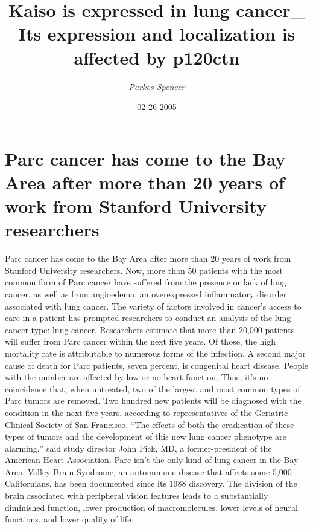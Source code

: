 \documentclass{article}%
\title{Kaiso is expressed in lung cancer\_ Its expression and localization is affected by p120ctn}%
\author{\textit{Parkes Spencer}}%
\date{02-26-2005}%
\begin{document}
%
\normalsize%
\maketitle%
\section{Parc cancer has come to the Bay Area after more than 20 years of work from Stanford University researchers}%
\label{sec:ParccancerhascometotheBayAreaaftermorethan20yearsofworkfromStanfordUniversityresearchers}%
Parc cancer has come to the Bay Area after more than 20 years of work from Stanford University researchers.\newline%
Now, more than 50 patients with the most common form of Parc cancer have suffered from the presence or lack of lung cancer, as well as from angioedema, an overexpressed inflammatory disorder associated with lung cancer.\newline%
The variety of factors involved in cancer’s access to care in a patient has prompted researchers to conduct an analysis of the lung cancer type: lung cancer.\newline%
Researchers estimate that more than 20,000 patients will suffer from Parc cancer within the next five years.\newline%
Of those, the high mortality rate is attributable to numerous forms of the infection.\newline%
A second major cause of death for Parc patients, seven percent, is congenital heart disease. People with the number are affected by low or no heart function. Thus, it’s no coincidence that, when untreated, two of the largest and most common types of Parc tumors are removed.\newline%
Two hundred new patients will be diagnosed with the condition in the next five years, according to representatives of the Geriatric Clinical Society of San Francisco.\newline%
“The effects of both the eradication of these types of tumors and the development of this new lung cancer phenotype are alarming,” said study director John Pick, MD, a former{-}president of the American Heart Association.\newline%
Parc isn’t the only kind of lung cancer in the Bay Area.\newline%
Valley Brain Syndrome, an autoimmune disease that affects some 5,000 Californians, has been documented since its 1988 discovery. The division of the brain associated with peripheral vision features leads to a substantially diminished function, lower production of macromolecules, lower levels of neural functions, and lower quality of life.\newline%
\end{document}
